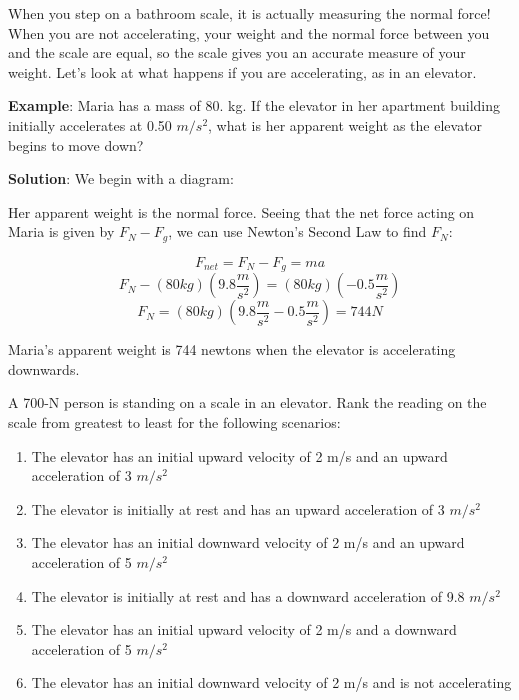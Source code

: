 When you step on a bathroom scale, it is actually measuring the normal force! 
When you are not accelerating, your weight and the normal force between you and 
the scale are equal, so the scale gives you an accurate measure of your weight. 
Let's look at what happens if you are accelerating, as in an elevator.

\textbf{Example}: Maria has a mass of 80. kg. If the elevator in her apartment 
building initially accelerates at 0.50 $m/s^2$, what is her apparent weight as 
the elevator begins to move down?

\textbf{Solution}: We begin with a diagram:
\begin{center}
\end{center}

Her apparent weight is the normal force. Seeing that the net force acting on 
Maria is given by $F_N - F_g$, we can use Newton's Second Law to find $F_N$:

$$F_{net} = F_N - F_g = ma$$
$$F_N - \left( 80 kg \right) \left(9.8 \frac{m}{s^2} \right) = \left( 80 kg 
\right) \left( -0.5 \frac{m}{s^2} \right)$$
$$F_N = \left( 80 kg \right) \left( 9.8 \frac{m}{s^2} - 0.5 \frac{m}{s^2} 
\right) = 744 N$$

Maria's apparent weight is 744 newtons when the elevator is accelerating 
downwards. 

\begin{Exercise}[title = Moving Elevators, label = elevator]
A 700-N person is standing on a scale in an elevator. Rank the reading on the 
scale from greatest to least for the following scenarios:
\begin{enumerate}
\item The elevator has an initial upward velocity of 2 m/s and an upward 
acceleration of 3 $m/s^2$
\item The elevator is initially at rest and has an upward acceleration of 3 
$m/s^2$
\item The elevator has an initial downward velocity of 2 m/s and an upward 
acceleration of 5 $m/s^2$
\item The elevator is initially at rest and has a downward acceleration of 
9.8 $m/s^2$
\item The elevator has an initial upward velocity of 2 m/s and a downward 
acceleration of 5 $m/s^2$
\item The elevator has an initial downward velocity of 2 m/s and is not 
accelerating 
\end{enumerate}
\end{Exercise}


